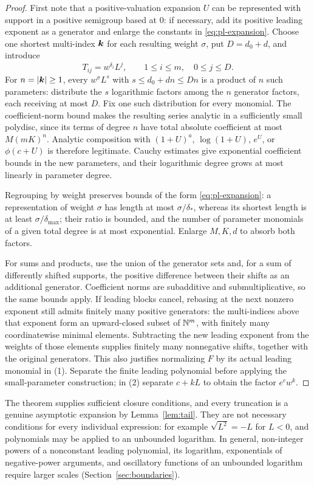 \begin{proof}
First note that a positive-valuation expansion $U$ can be represented with support in a positive semigroup based at $0$: if necessary, add its positive leading exponent as a generator and enlarge the constants in \eqref{eq:pl-expansion}. Choose one shortest multi-index $\boldsymbol k$ for each resulting weight $\sigma$, put $D=d_0+d$, and introduce
\[
 T_{ij}=w^{\delta_i}L^j,\qquad 1\le i\le m,\quad 0\le j\le D.
\]
For $n=|\boldsymbol k|\ge1$, every $w^\sigma L^s$ with $s\le d_0+dn\le Dn$ is a product of $n$ such parameters: distribute the $s$ logarithmic factors among the $n$ generator factors, each receiving at most $D$. Fix one such distribution for every monomial. The coefficient-norm bound makes the resulting series analytic in a sufficiently small polydisc, since its terms of degree $n$ have total absolute coefficient at most $M(mK)^n$. Analytic composition with $(1+U)^a$, $\log(1+U)$, $e^U$, or $\phi(c+U)$ is therefore legitimate. Cauchy estimates give exponential coefficient bounds in the new parameters, and their logarithmic degree grows at most linearly in parameter degree.

Regrouping by weight preserves bounds of the form \eqref{eq:pl-expansion}: a representation of weight $\sigma$ has length at most $\sigma/\delta_*$, whereas its shortest length is at least $\sigma/\delta_{\max}$; their ratio is bounded, and the number of parameter monomials of a given total degree is at most exponential. Enlarge $M,K,d$ to absorb both factors.

For sums and products, use the union of the generator sets and, for a sum of differently shifted supports, the positive difference between their shifts as an additional generator. Coefficient norms are subadditive and submultiplicative, so the same bounds apply. If leading blocks cancel, rebasing at the next nonzero exponent still admits finitely many positive generators: the multi-indices above that exponent form an upward-closed subset of $\mathbb N^m$, with finitely many coordinatewise minimal elements. Subtracting the new leading exponent from the weights of those elements supplies finitely many nonnegative shifts, together with the original generators. This also justifies normalizing $F$ by its actual leading monomial in (1). Separate the finite leading polynomial before applying the small-parameter construction; in (2) separate $c+kL$ to obtain the factor $e^cw^k$.
\end{proof}

The theorem supplies sufficient closure conditions, and every truncation is a genuine asymptotic expansion by Lemma~\ref{lem:tail}. They are not necessary conditions for every individual expression: for example $\sqrt{L^2}=-L$ for $L<0$, and polynomials may be applied to an unbounded logarithm. In general, non-integer powers of a nonconstant leading polynomial, its logarithm, exponentials of negative-power arguments, and oscillatory functions of an unbounded logarithm require larger scales (Section~\ref{sec:boundaries}).

